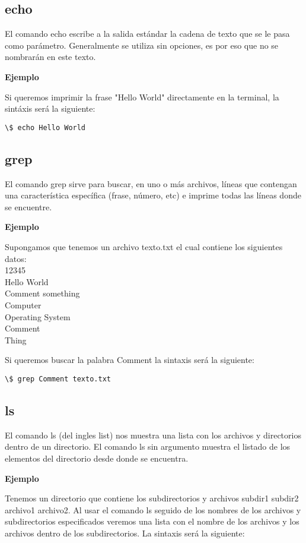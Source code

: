 \documentclass[12pt]{article}
\begin{document}
\subsection{echo}

El comando echo escribe a la salida estándar la cadena de texto que se le pasa como parámetro. Generalmente se utiliza sin opciones, es por eso que no se nombrarán en este texto.

\textbf{Ejemplo}

Si queremos imprimir la frase "Hello World" directamente en la terminal, la sintáxis será la siguiente:
\begin{verbatim}
\$ echo Hello World
\end{verbatim}

\subsection{grep}

El comando grep sirve para buscar, en uno o más archivos, líneas que contengan una característica específica (frase, número, etc) e imprime todas las líneas donde se encuentre.

\textbf{Ejemplo}

Supongamos que tenemos un archivo texto.txt el cual contiene los siguientes datos:\\12345\\Hello World\\Comment something\\Computer\\Operating System\\Comment
\\Thing

Si queremos buscar la palabra Comment la sintaxis será la siguiente:

\begin{verbatim}
\$ grep Comment texto.txt
\end{verbatim}

\subsection{ls}

El comando ls (del ingles list) nos muestra una lista con los archivos y directorios dentro de un directorio. El comando ls sin argumento muestra el listado de los elementos del directorio desde donde se encuentra.

\textbf{Ejemplo}

Tenemos un directorio que contiene los subdirectorios y archivos subdir1 subdir2 archivo1 archivo2. Al usar el comando ls seguido de los nombres de los archivos y subdirectorios especificados veremos una lista con el nombre de los archivos y los archivos dentro de los subdirectorios. La sintaxis será la siguiente:
\end{document}
